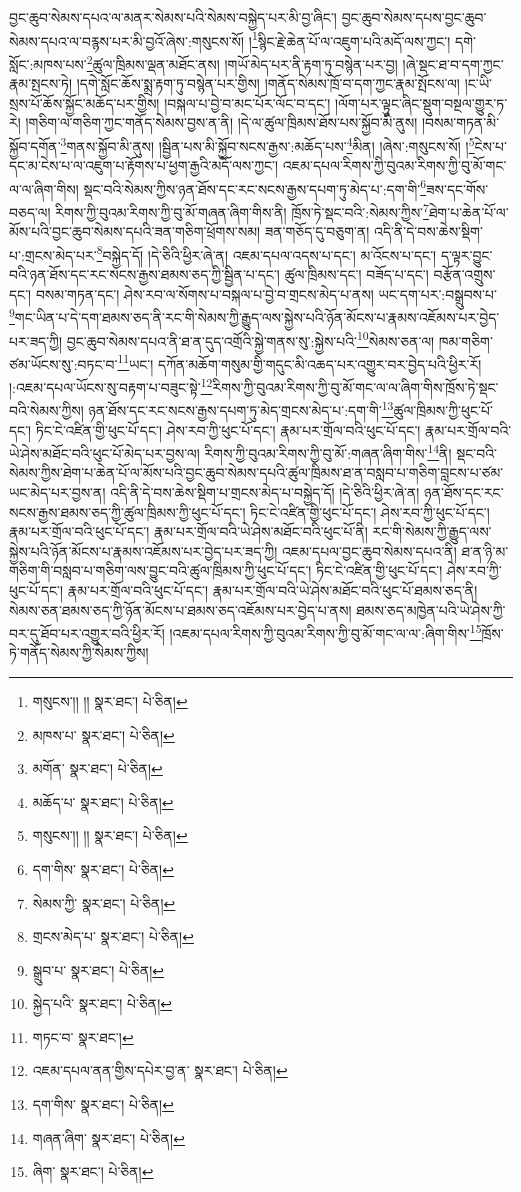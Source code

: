 བྱང་ཆུབ་སེམས་དཔའ་ལ་མནར་སེམས་པའི་སེམས་བསྐྱེད་པར་མི་བྱ་ཞིང་། བྱང་ཆུབ་སེམས་དཔས་བྱང་ཆུབ་སེམས་དཔའ་ལ་བརྙས་པར་མི་བྱའོ་ཞེས་:གསུངས་སོ། །\footnote{གསུངས་།། །།  སྣར་ཐང་།  པེ་ཅིན། }སྙིང་རྗེ་ཆེན་པོ་ལ་འཇུག་པའི་མདོ་ལས་ཀྱང་། དགེ་སློང་:མཁས་པས་\footnote{མཁས་པ་  སྣར་ཐང་།  པེ་ཅིན། }ཚུལ་ཁྲིམས་ལྡན་མཐོང་ནས། །གཡོ་མེད་པར་ནི་རྟག་ཏུ་བསྙེན་པར་བྱ། །ཞེ་སྡང་ཐ་བ་དག་ཀྱང་རྣམ་སྤངས་ཏེ། །དགེ་སློང་ཆོས་སྨྲ་རྟག་ཏུ་བསྙེན་པར་གྱིས། །གནོད་སེམས་ཁྲོ་བ་དག་ཀྱང་རྣམ་སྤོངས་ལ། །ང་ཡི་སྲས་པོ་ཆོས་སྐྱོང་མཆོད་པར་གྱིས། །བསྐལ་པ་བྱེ་བ་མང་པོར་ལོང་བ་དང་། །ལོག་པར་ལྟུང་ཞིང་སྡུག་བསྔལ་གྱུར་ཏ་རེ། །གཅིག་ལ་གཅིག་ཀྱང་གནོད་སེམས་བྱས་ན་ནི། །དེ་ལ་ཚུལ་ཁྲིམས་ཐོས་པས་སྐྱོབ་མི་ནུས། །བསམ་གཏན་མི་སྐྱོབ་དགོན་\footnote{མགོན་  སྣར་ཐང་།  པེ་ཅིན། }གནས་སྐྱོབ་མི་ནུས། །སྦྱིན་པས་མི་སྐྱོབ་སངས་རྒྱས་:མཆོད་པས་\footnote{མཆོད་པ་  སྣར་ཐང་།  པེ་ཅིན། }མིན། །ཞེས་:གསུངས་སོ། །\footnote{གསུངས་།། །།  སྣར་ཐང་།  པེ་ཅིན། }ངེས་པ་དང་མ་ངེས་པ་ལ་འཇུག་པ་རྟོགས་པ་ཕྱག་རྒྱའི་མདོ་ལས་ཀྱང་། འཇམ་དཔལ་རིགས་ཀྱི་བུའམ་རིགས་ཀྱི་བུ་མོ་གང་ལ་ལ་ཞིག་གིས། སྡང་བའི་སེམས་ཀྱིས་ཉན་ཐོས་དང་རང་སངས་རྒྱས་དཔག་ཏུ་མེད་པ་:དག་གི་\footnote{དག་གིས་  སྣར་ཐང་།  པེ་ཅིན། }ཟས་དང་གོས་བཅད་ལ། རིགས་ཀྱི་བུའམ་རིགས་ཀྱི་བུ་མོ་གཞན་ཞིག་གིས་ནི། ཁྲོས་ཏེ་སྡང་བའི་:སེམས་ཀྱིས་\footnote{སེམས་ཀྱི་  སྣར་ཐང་།  པེ་ཅིན། }ཐེག་པ་ཆེན་པོ་ལ་མོས་པའི་བྱང་ཆུབ་སེམས་དཔའི་ཟན་གཅིག་ཕྲོགས་སམ། ཟན་གཅོད་དུ་བཅུག་ན། འདི་ནི་དེ་བས་ཆེས་སྡིག་པ་:གྲངས་མེད་པར་\footnote{གྲངས་མེད་པ་  སྣར་ཐང་།  པེ་ཅིན། }བསྐྱེད་དོ། །དེ་ཅིའི་ཕྱིར་ཞེ་ན། འཇམ་དཔལ་འདས་པ་དང་། མ་འོངས་པ་དང་། ད་ལྟར་བྱུང་བའི་ཉན་ཐོས་དང་རང་སངས་རྒྱས་ཐམས་ཅད་ཀྱི་སྦྱིན་པ་དང་། ཚུལ་ཁྲིམས་དང་། བཟོད་པ་དང་། བརྩོན་འགྲུས་དང་། བསམ་གཏན་དང་། ཤེས་རབ་ལ་སོགས་པ་བསྐལ་པ་བྱེ་བ་གྲངས་མེད་པ་ནས། ཡང་དག་པར་:བསྒྲུབས་པ་\footnote{སྒྲུབ་པ་  སྣར་ཐང་།  པེ་ཅིན། }གང་ཡིན་པ་དེ་དག་ཐམས་ཅད་ནི་རང་གི་སེམས་ཀྱི་རྒྱུད་ལས་སྐྱེས་པའི་ཉོན་མོངས་པ་རྣམས་འཇོམས་པར་བྱེད་པར་ཟད་ཀྱི། བྱང་ཆུབ་སེམས་དཔའ་ནི་ཐ་ན་དུད་འགྲོའི་སྐྱེ་གནས་སུ་:སྐྱེས་པའི་\footnote{སྐྱེད་པའི་  སྣར་ཐང་།  པེ་ཅིན། }སེམས་ཅན་ལ། ཁམ་གཅིག་ཙམ་ཡོངས་སུ་:བཏང་བ་\footnote{གཏང་བ་  སྣར་ཐང་། }ཡང་། དཀོན་མཆོག་གསུམ་གྱི་གདུང་མི་འཆད་པར་འགྱུར་བར་བྱེད་པའི་ཕྱིར་རོ། །:འཇམ་དཔལ་ཡོངས་སུ་བརྟག་པ་བཟུང་སྟེ་\footnote{འཇམ་དཔལ་ནན་གྱིས་དཔེར་བྱ་ན་  སྣར་ཐང་།  པེ་ཅིན། }རིགས་ཀྱི་བུའམ་རིགས་ཀྱི་བུ་མོ་གང་ལ་ལ་ཞིག་གིས་ཁྲོས་ཏེ་སྡང་བའི་སེམས་ཀྱིས། ཉན་ཐོས་དང་རང་སངས་རྒྱས་དཔག་ཏུ་མེད་གྲངས་མེད་པ་:དག་གི་\footnote{དག་གིས་  སྣར་ཐང་།  པེ་ཅིན། }ཚུལ་ཁྲིམས་ཀྱི་ཕུང་པོ་དང་། ཏིང་ངེ་འཛིན་གྱི་ཕུང་པོ་དང་། ཤེས་རབ་ཀྱི་ཕུང་པོ་དང་། རྣམ་པར་གྲོལ་བའི་ཕུང་པོ་དང་། རྣམ་པར་གྲོལ་བའི་ཡེ་ཤེས་མཐོང་བའི་ཕུང་པོ་མེད་པར་བྱས་ལ། རིགས་ཀྱི་བུའམ་རིགས་ཀྱི་བུ་མོ་:གཞན་ཞིག་གིས་\footnote{གཞན་ཞིག་  སྣར་ཐང་།  པེ་ཅིན། }ནི། སྡང་བའི་སེམས་ཀྱིས་ཐེག་པ་ཆེན་པོ་ལ་མོས་པའི་བྱང་ཆུབ་སེམས་དཔའི་ཚུལ་ཁྲིམས་ཐ་ན་བསླབ་པ་གཅིག་བླངས་པ་ཙམ་ཡང་མེད་པར་བྱས་ན། འདི་ནི་དེ་བས་ཆེས་སྡིག་པ་གྲངས་མེད་པ་བསྐྱེད་དོ། །དེ་ཅིའི་ཕྱིར་ཞེ་ན། ཉན་ཐོས་དང་རང་སངས་རྒྱས་ཐམས་ཅད་ཀྱི་ཚུལ་ཁྲིམས་ཀྱི་ཕུང་པོ་དང་། ཏིང་ངེ་འཛིན་གྱི་ཕུང་པོ་དང་། ཤེས་རབ་ཀྱི་ཕུང་པོ་དང་། རྣམ་པར་གྲོལ་བའི་ཕུང་པོ་དང་། རྣམ་པར་གྲོལ་བའི་ཡེ་ཤེས་མཐོང་བའི་ཕུང་པོ་ནི། རང་གི་སེམས་ཀྱི་རྒྱུད་ལས་སྐྱེས་པའི་ཉོན་མོངས་པ་རྣམས་འཇོམས་པར་བྱེད་པར་ཟད་ཀྱི། འཇམ་དཔལ་བྱང་ཆུབ་སེམས་དཔའ་ནི། ཐ་ན་ཉི་མ་གཅིག་གི་བསླབ་པ་གཅིག་ལས་བྱུང་བའི་ཚུལ་ཁྲིམས་ཀྱི་ཕུང་པོ་དང་། ཏིང་ངེ་འཛིན་གྱི་ཕུང་པོ་དང་། ཤེས་རབ་ཀྱི་ཕུང་པོ་དང་། རྣམ་པར་གྲོལ་བའི་ཕུང་པོ་དང་། རྣམ་པར་གྲོལ་བའི་ཡེ་ཤེས་མཐོང་བའི་ཕུང་པོ་ཐམས་ཅད་ནི། སེམས་ཅན་ཐམས་ཅད་ཀྱི་ཉོན་མོངས་པ་ཐམས་ཅད་འཇོམས་པར་བྱེད་པ་ནས། ཐམས་ཅད་མཁྱེན་པའི་ཡེ་ཤེས་ཀྱི་བར་དུ་ཐོབ་པར་འགྱུར་བའི་ཕྱིར་རོ། །འཇམ་དཔལ་རིགས་ཀྱི་བུའམ་རིགས་ཀྱི་བུ་མོ་གང་ལ་ལ་:ཞིག་གིས་\footnote{ཞིག་  སྣར་ཐང་།  པེ་ཅིན། }ཁྲོས་ཏེ་གནོད་སེམས་ཀྱི་སེམས་ཀྱིས། 